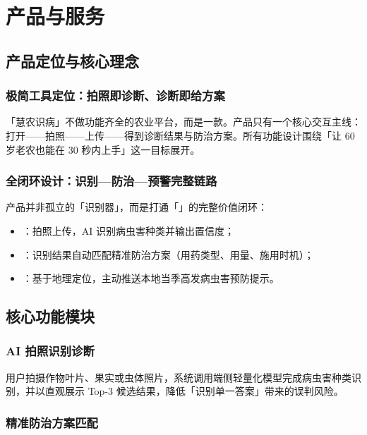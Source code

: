 \chapter{产品与服务}

\section{产品定位与核心理念}

\subsection{极简工具定位：拍照即诊断、诊断即给方案}

「慧农识病」不做功能齐全的农业平台，而是一款。产品只有一个核心交互主线：打开——拍照——上传——得到诊断结果与防治方案。所有功能设计围绕「让 60 岁老农也能在 30 秒内上手」这一目标展开。

\subsection{全闭环设计：识别—防治—预警完整链路}

产品并非孤立的「识别器」，而是打通「」的完整价值闭环：

\begin{itemize}[leftmargin=1.6em]
  \item {}：拍照上传，AI 识别病虫害种类并输出置信度；
  \item {}：识别结果自动匹配精准防治方案（用药类型、用量、施用时机）；
  \item {}：基于地理定位，主动推送本地当季高发病虫害预防提示。
\end{itemize}

\section{核心功能模块}

\subsection{AI 拍照识别诊断}

用户拍摄作物叶片、果实或虫体照片，系统调用端侧轻量化模型完成病虫害种类识别，并以直观展示 Top-3 候选结果，降低「识别单一答案」带来的误判风险。

\subsection{精准防治方案匹配}

